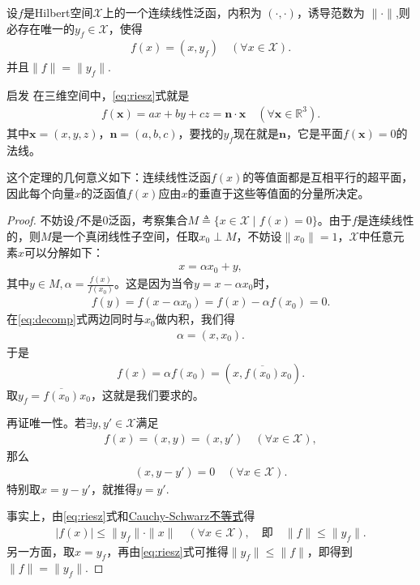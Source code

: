 \documentclass[../../main.tex]{subfiles}%
\begin{document}
\begin{theorem}\label{theorem:Riesz表示定理(Hilbert空间)}
设$f$是Hilbert空间$\mathscr{X}$上的一个连续线性泛函，内积为 $(\cdot,\cdot)$，诱导范数为 $\|\cdot\|$,则必存在唯一的$y_f\in\mathscr{X}$，使得
\begin{align}
f(x)=(x,y_f)\quad (\forall x\in\mathscr{X}).
\label{eq:riesz}
\end{align}
并且$\|f\|=\|y_f\|$.
\end{theorem}
\begin{remark}
启发 在三维空间中，\eqref{eq:riesz}式就是
\begin{align*}
f(\bm{x}) = ax + by + cz = \bm{n}\cdot\bm{x} \quad (\forall \bm{x}\in\mathbb{R}^3).
\end{align*}
其中$\bm{x}=(x,y,z)$，$\bm{n}=(a,b,c)$，要找的$y_f$现在就是$\bm{n}$，它是平面$f(\bm{x})=0$的法线。
\end{remark}
\begin{remark}
这个定理的几何意义如下：连续线性泛函$f(x)$的等值面都是互相平行的超平面，因此每个向量$x$的泛函值$f(x)$应由$x$的垂直于这些等值面的分量所决定。
\end{remark}
\begin{proof}

不妨设$f$不是0泛函，考察集合$M\triangleq\{x\in\mathscr{X}\mid f(x)=0\}$。由于$f$是连续线性的，则$M$是一个真闭线性子空间，任取$x_0\perp M$，不妨设$\|x_0\|=1$，$\mathscr{X}$中任意元素$x$可以分解如下：
\begin{align}
x=\alpha x_0 + y,
\label{eq:decomp}
\end{align}
其中$y\in M,\alpha=\frac{f(x)}{f(x_0)}$。这是因为当令$y=x-\alpha x_0$时，
\begin{align*}
f(y)=f(x-\alpha x_0)=f(x)-\alpha f(x_0)=0.
\end{align*}
在\eqref{eq:decomp}式两边同时与$x_0$做内积，我们得
\begin{align*}
\alpha=(x,x_0).
\end{align*}
于是
\begin{align*}
f(x)=\alpha f(x_0)=(x,\overline{f(x_0)}x_0).
\end{align*}
取$y_f=\overline{f(x_0)}x_0$，这就是我们要求的。

再证唯一性。若$\exists y,y'\in\mathscr{X}$满足
\begin{align*}
f(x)=(x,y)=(x,y')\quad (\forall x\in\mathscr{X}),
\end{align*}
那么
\begin{align*}
(x,y-y')=0\quad (\forall x\in\mathscr{X}).
\end{align*}
特别取$x=y-y'$，就推得$y=y'$.

事实上，由\eqref{eq:riesz}式和\hyperref[theorem:泛函分析--Cauchy-Schwarz不等式]{Cauchy-Schwarz不等式}得
\begin{align*}
|f(x)|\leqslant\|y_f\|\cdot\|x\|\quad (\forall x\in\mathscr{X}),\quad \text{即}\quad \|f\|\leqslant\|y_f\|.
\end{align*}
另一方面，取$x=y_f$，再由\eqref{eq:riesz}式可推得$\|y_f\|\leqslant\|f\|$，即得到$\|f\|=\|y_f\|$.
\end{proof}
\end{document}
